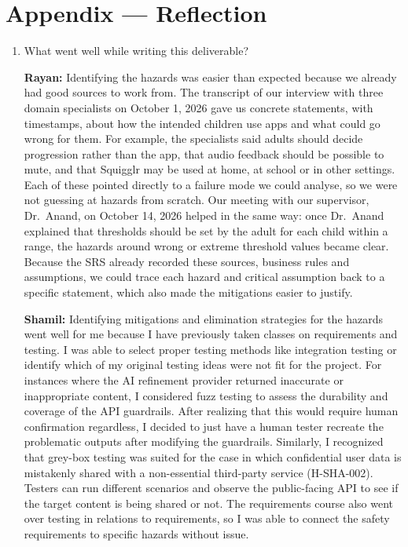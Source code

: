 \documentclass{article}
\begin{document}
\newpage{}

\section{Appendix --- Reflection}



\begin{enumerate}

\item What went well while writing this deliverable?

\textbf{Rayan:} Identifying the hazards was easier than expected because we
already had good sources to work from. The transcript of our interview with
three domain specialists on October 1, 2026 gave us concrete statements, with
timestamps, about how the intended children use apps and what could go wrong for
them. For example, the specialists said adults should decide progression rather
than the app, that audio feedback should be possible to mute, and that Squigglr
may be used at home, at school or in other settings. Each of these pointed
directly to a failure mode we could analyse, so we were not guessing at hazards
from scratch. Our meeting with our supervisor, Dr.~Anand, on October 14, 2026
helped in the same way: once Dr.~Anand explained that thresholds should be set
by the adult for each child within a range, the hazards around wrong or extreme
threshold values became clear. Because the SRS already recorded these sources,
business rules and assumptions, we could trace each hazard and critical
assumption back to a specific statement, which also made the mitigations easier
to justify.

\textbf{Shamil:} Identifying mitigations and elimination strategies for the
hazards went well for me because I have previously taken classes on requirements
and testing. I was able to select proper testing methods like integration
testing or identify which of my original testing ideas were not fit for the
project. For instances where the AI refinement provider returned inaccurate or
inappropriate content, I considered fuzz testing to assess the durability and
coverage of the API guardrails. After realizing that this would require human
confirmation regardless, I decided to just have a human tester recreate the
problematic outputs after modifying the guardrails. Similarly, I recognized that
grey-box testing was suited for the case in which confidential user data is
mistakenly shared with a non-essential third-party service (H-SHA-002). Testers
can run different scenarios and observe the public-facing API to see if the
target content is being shared or not. The requirements course also went over
testing in relations to requirements, so I was able to connect the safety
requirements to specific hazards without issue.


\end{enumerate}
\end{document}
